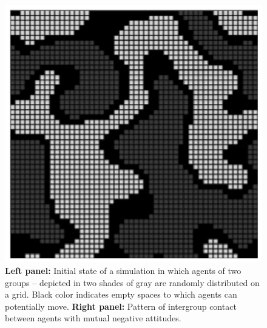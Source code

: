 \documentclass{beamer}
\begin{document}
\begin{frame}
{\begin{figure}
\begin{minipage}{.49\textwidth}
         \end{minipage}
         \begin{minipage}{.49\textwidth}
            \includegraphics[width = \textwidth]{wouter2.png}
         \end{minipage}
         \caption{\footnotesize\textbf{Left panel:} Initial state of a
         simulation in which agents of two groups – depicted in two shades of
         gray are randomly distributed on a grid.  Black color indicates empty
         spaces to which agents can potentially move. \textbf{Right panel:}
         Pattern of intergroup contact between agents with mutual negative
         attitudes.}
      \end{figure}
   }
\end{frame}
\end{document}
